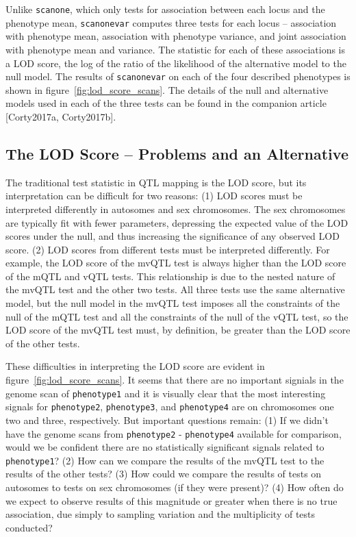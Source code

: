 \documentclass{article}
\begin{document}
Unlike \texttt{scanone}, which only tests for association between each locus and the phenotype mean, \texttt{scanonevar} computes three tests for each locus -- association with phenotype mean, association with phenotype variance, and joint association with phenotype mean and variance.
The statistic for each of these associations is a LOD score, the log of the ratio of the likelihood of the alternative model to the null model.
The results of \texttt{scanonevar} on each of the four described phenotypes is shown in figure~\ref{fig:lod_score_scans}.
The details of the null and alternative models used in each of the three tests can be found in the companion article [Corty2017a, Corty2017b].


\subsection*{The LOD Score -- Problems and an Alternative}
The traditional test statistic in QTL mapping is the LOD score, but its interpretation can be difficult for two reasons:
(1) LOD scores must be interpreted differently in autosomes and sex chromosomes.
The sex chromosomes are typically fit with fewer parameters, depressing the expected value of the LOD scores under the null, and thus increasing the significance of any observed LOD score.
(2) LOD scores from different tests must be interpreted differently.
For example, the LOD score of the mvQTL test is always higher than the LOD score of the mQTL and vQTL tests.
This relationship is due to the nested nature of the mvQTL test and the other two tests.
All three tests use the same alternative model, but the null model in the mvQTL test imposes all the constraints of the null of the mQTL test and all the constraints of the null of the vQTL test, so the LOD score of the mvQTL test must, by definition, be greater than the LOD score of the other tests.

These difficulties in interpreting the LOD score are evident in figure~\ref{fig:lod_score_scans}.
It seems that there are no important signials in the genome scan of \texttt{phenotype1} and it is visually clear that the most interesting signals for \texttt{phenotype2}, \texttt{phenotype3}, and \texttt{phenotype4} are on chromosomes one two and three, respectively.
But important questions remain:
(1) If we didn't have the genome scans from \texttt{phenotype2} - \texttt{phenotype4} available for comparison, would we be confident there are no statistically significant signals related to \texttt{phenotype1}?
(2) How can we compare the results of the mvQTL test to the results of the other tests?
(3) How could we compare the results of tests on autosomes to tests on sex chromosomes (if they were present)?
(4) How often do we expect to observe results of this magnitude or greater when there is no true association, due simply to sampling variation and the multiplicity of tests conducted?
\end{document}
